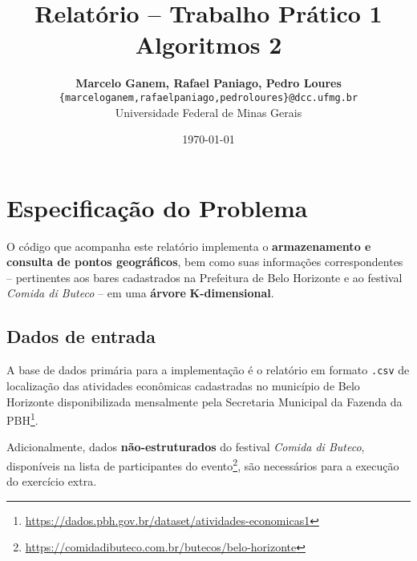 \documentclass[10pt,a4paper]{article}
\title{Relatório -- Trabalho Prático 1\vspace{0.25cm}\\ \Large Algoritmos 2}
\author{{\bfseries Marcelo Ganem, Rafael Paniago, Pedro Loures }\vspace{0.075cm} \\ \texttt{\{marceloganem,rafaelpaniago,pedroloures\}@dcc.ufmg.br} \vspace{0.15cm}\\ Universidade Federal de Minas Gerais}
\date{\today}
\begin{document}
\makeatletter

\twocolumn
\maketitle


\section{Especificação do Problema}
\label{specs}

O código que acompanha este relatório implementa o \textbf{armazenamento e consulta de pontos geográficos}, bem como suas informações correspondentes -- pertinentes aos bares cadastrados na Prefeitura de Belo Horizonte e ao festival \textit{Comida di Buteco} -- em uma \textbf{árvore} \textbf{K-dimensional}.

\subsection{Dados de entrada}
\label{raw-data}

A base de dados primária para a implementação é o relatório em formato \texttt{.csv} de localização das atividades econômicas cadastradas no município de Belo Horizonte disponibilizada mensalmente pela Secretaria Municipal da Fazenda da PBH\footnote{\url{https://dados.pbh.gov.br/dataset/atividades-economicas1}}.

Adicionalmente, dados \textbf{não-estruturados} do festival \textit{Comida di Buteco}, disponíveis na lista de participantes do evento\footnote{\url{https://comidadibuteco.com.br/butecos/belo-horizonte}}, são necessários para a execução do exercício extra.
\end{document}
